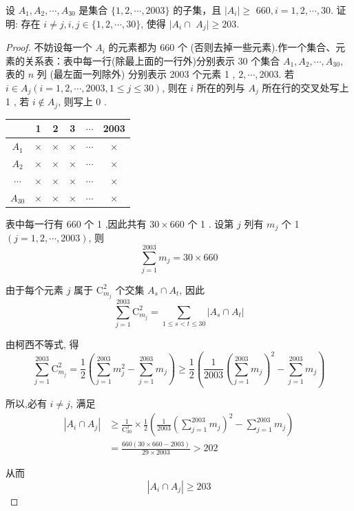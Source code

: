 \begin{example}
	设 $A_{1}, A_{2}, \cdots, A_{30}$ 是集合 $\{1,2, \cdots, 2003\}$ 的子集，且 $\left|A_{i}\right| \geqslant$ $660, i=1,2, \cdots, 30$. 证明: 存在 $i \neq j, i, j \in\{1,2, \cdots, 30\}$, 使得 $\mid A_{i} \cap$ $A_{j} \mid \geqslant 203$.
\end{example}

\begin{proof}
	不妨设每一个 $A_{i}$ 的元素都为 660 个 (否则去掉一些元素).作一个集合、元素的关系表：表中每一行(除最上面的一行外)分别表示 30 个集合 $A_{1}, A_{2}, \cdots, A_{30}$, 表的 $n$ 列 (最左面一列除外) 分别表示 2003 个元素 1 , $2, \cdots, 2003$. 若 $i \in A_{j}(i=1,2, \cdots, 2003,1 \leqslant j \leqslant 30)$, 则在 $i$ 所在的列与 $A_{j}$ 所在行的交叉处写上 1 , 若 $i \notin A_{j}$, 则写上 0 .

	\begin{center}
		\begin{tabular}{c|ccccc}
			         & 1        & 2        & 3        & $\cdots$ & 2003     \\
			\hline
			$A_{1}$  & $\times$ & $\times$ & $\times$ & $\cdots$ & $\times$ \\
			$A_{2}$  & $\times$ & $\times$ & $\times$ & $\cdots$ & $\times$ \\
			$\cdots$ & $\times$ & $\times$ & $\times$ & $\cdots$ & $\times$ \\
			$A_{30}$ & $\times$ & $\times$ & $\times$ & $\cdots$ & $\times$ \\
		\end{tabular}
	\end{center}

	表中每一行有 660 个 1 ,因此共有 $30 \times 660$ 个 1 . 设第 $j$ 列有 $m_{j}$ 个 1 $(j=1,2, \cdots, 2003)$, 则
	$$
		\sum_{j=1}^{2003} m_{j}=30 \times 660
	$$

	由于每个元素 $j$ 属于 $\mathrm{C}_{m_{j}}^{2}$ 个交集 $A_{s} \cap A_{t}$, 因此
	$$
		\sum_{j=1}^{2003} \mathrm{C}_{m_{j}}^{2}=\sum_{1 \leqslant s<t \leqslant 30}\left|A_{s} \cap A_{t}\right|
	$$

	由柯西不等式, 得
	$$
		\sum_{j=1}^{2003} \mathrm{C}_{m_{j}}^{2}=\frac{1}{2}\left(\sum_{j=1}^{2003} m_{j}^{2}-\sum_{j=1}^{2003} m_{j}\right) \geqslant \frac{1}{2}\left(\frac{1}{2003}\left(\sum_{j=1}^{2003} m_{j}\right)^{2}-\sum_{j=1}^{2003} m_{j}\right)
	$$

	所以,必有 $i \neq j$, 满足
	$$
		\begin{aligned}
			\left|A_{i} \cap A_{j}\right| & \geqslant \frac{1}{\mathrm{C}_{30}^{2}} \times \frac{1}{2}\left(\frac{1}{2003}\left(\sum_{j=1}^{2003} m_{j}\right)^{2}-\sum_{j=1}^{2003} m_{j}\right) \\
			                              & =\frac{660(30 \times 660-2003)}{29 \times 2003}>202
		\end{aligned}
	$$

	从而
	$$
		\left|A_{i} \cap A_{j}\right| \geqslant 203
	$$
\end{proof}

